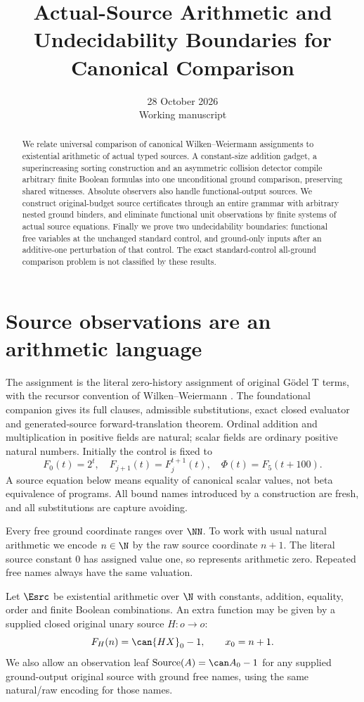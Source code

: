 \documentclass[11pt,a4paper]{article}
\title{Actual-Source Arithmetic and\\Undecidability Boundaries for Canonical Comparison}
\author{}
\date{28 October 2026\\Working manuscript}
\begin{document}
\maketitle
\begin{abstract}
We relate universal comparison of canonical Wilken--Weiermann assignments
to existential arithmetic of actual typed sources.  A constant-size addition
gadget, a superincreasing sorting construction and an asymmetric collision
detector compile arbitrary finite Boolean formulas into one unconditional
ground comparison, preserving shared witnesses.  Absolute observers also
handle functional-output sources.  We construct original-budget source
certificates through an entire grammar with arbitrary nested ground binders,
and eliminate functional unit observations by finite systems of actual source
equations.  Finally we prove two undecidability boundaries: functional free
variables at the unchanged standard control, and ground-only inputs after
an additive-one perturbation of that control.  The exact standard-control
all-ground comparison problem is not classified by these results.
\end{abstract}
\tableofcontents

\section{Source observations are an arithmetic language}

The assignment is the literal zero-history assignment of original G\"odel T
terms, with the recursor convention of Wilken--Weiermann \cite{ww}.
The foundational companion \cite{wwfoundations} gives its full clauses,
admissible substitutions, exact closed evaluator and generated-source
forward-translation theorem.  Ordinal addition and multiplication in positive
fields are natural; scalar fields are ordinary positive natural numbers.
Initially the control is fixed to
\[
 F_0(t)=2^t,\quad F_{j+1}(t)=F_j^{t+1}(t),\quad\Phi(t)=F_5(t+100).
\]
A source equation below means equality of canonical scalar values, not beta
equivalence of programs.  All bound names introduced by a construction are
fresh, and all substitutions are capture avoiding.

Every free ground coordinate ranges over $\NN$.  To work with usual natural
arithmetic we encode $n\in\N$ by the raw source coordinate $n+1$.
The literal source constant $0$ has assigned value one, so represents
arithmetic zero.  Repeated free names always have the same valuation.

\begin{definition}\label{def:source-language}
Let $\Esrc$ be existential arithmetic over $\N$ with constants, addition,
equality, order and finite Boolean combinations.  An extra function may be
given by a supplied closed original unary source $H:o\to o$:
\[
 F_H(n)=\can{HX}_0-1,\qquad x_0=n+1.
\]
We also allow an observation leaf $\operatorname{Source}(A)=\can A_0-1$
for any supplied ground-output original source with ground free names,
using the same natural/raw encoding for those names.
\end{definition}
\end{document}
